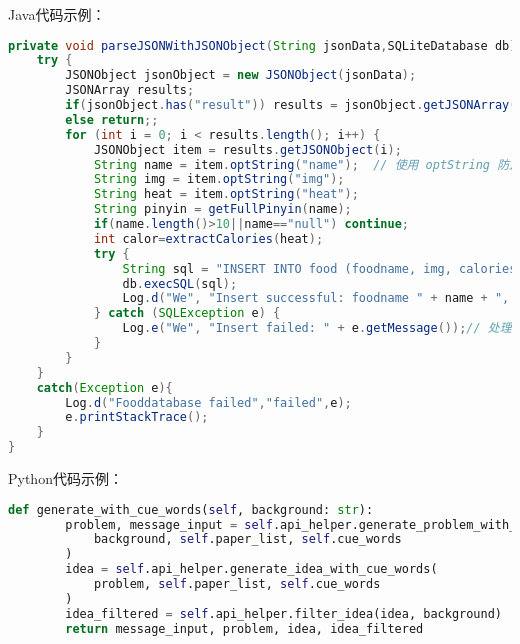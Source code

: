 Java代码示例：
\begin{lstlisting}[language=java]
private void parseJSONWithJSONObject(String jsonData,SQLiteDatabase db){
    try {
        JSONObject jsonObject = new JSONObject(jsonData);
        JSONArray results;
        if(jsonObject.has("result")) results = jsonObject.getJSONArray("result");  // 获取名为 "result" 的 JSON 数组
        else return;;
        for (int i = 0; i < results.length(); i++) {
            JSONObject item = results.getJSONObject(i);
            String name = item.optString("name");  // 使用 optString 防止 null 引起程序崩溃
            String img = item.optString("img");
            String heat = item.optString("heat");
            String pinyin = getFullPinyin(name);
            if(name.length()>10||name=="null") continue;
            int calor=extractCalories(heat);
            try {
                String sql = "INSERT INTO food (foodname, img, calories, unit, pinyin) VALUES ('" + name + "', '" + img + "', " + calor + ", '100', '" + pinyin + "')";
                db.execSQL(sql);
                Log.d("We", "Insert successful: foodname " + name + ", img " + img + ", heat " + calor +  ", pinyin " + pinyin);
            } catch (SQLException e) {
                Log.e("We", "Insert failed: " + e.getMessage());// 处理插入失败的情况
            }
        }
    }
    catch(Exception e){
        Log.d("Fooddatabase failed","failed",e);
        e.printStackTrace();
    }
}
\end{lstlisting}	

Python代码示例：
\begin{lstlisting}[language=python]
 def generate_with_cue_words(self, background: str):
        problem, message_input = self.api_helper.generate_problem_with_cue_words(
            background, self.paper_list, self.cue_words
        )
        idea = self.api_helper.generate_idea_with_cue_words(
            problem, self.paper_list, self.cue_words
        )
        idea_filtered = self.api_helper.filter_idea(idea, background)
        return message_input, problem, idea, idea_filtered

\end{lstlisting}	